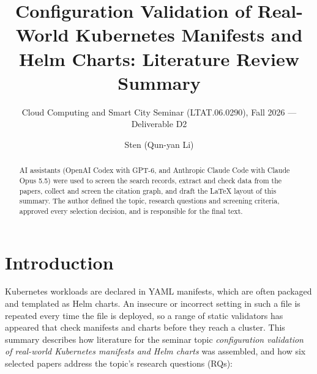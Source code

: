 \documentclass[sigconf,nonacm]{acmart}
\begin{document}
\title[Kubernetes Configuration Validation: Literature Review]{Configuration Validation of Real-World Kubernetes Manifests and Helm Charts: Literature Review Summary}
\subtitle{Cloud Computing and Smart City Seminar (LTAT.06.0290), Fall 2026 --- Deliverable D2}

\author{Sten (Qun-yan Li)}

\renewcommand\abstractname{Use of AI Tools}
\begin{abstract}
AI assistants (OpenAI Codex with GPT-6, and Anthropic Claude Code with Claude Opus 5.5) were used to screen the search records, extract and check data from the papers, collect and screen the citation graph, and draft the \LaTeX{} layout of this summary. The author defined the topic, research questions and screening criteria, approved every selection decision, and is responsible for the final text.
\end{abstract}


\maketitle

\section{Introduction}

Kubernetes workloads are declared in YAML manifests, which are often packaged and templated as Helm charts. An insecure or incorrect setting in such a file is repeated every time the file is deployed, so a range of static validators has appeared that check manifests and charts before they reach a cluster. This summary describes how literature for the seminar topic \emph{configuration validation of real-world Kubernetes manifests and Helm charts} was assembled, and how six selected papers address the topic's research questions (RQs):
\end{document}
